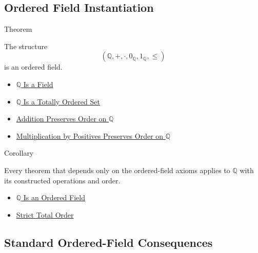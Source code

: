 \subsection*{Ordered Field Instantiation}

\begin{theorembox}{Theorem}
\begin{theorem}
\label{thm:q-is-an-ordered-field}
The structure
\[
(\mathbb{Q},+,\cdot,0_{\mathbb{Q}},1_{\mathbb{Q}},\le)
\]
is an ordered field.
\end{theorem}
\end{theorembox}

\begin{dependencies}
\begin{itemize}
  \item \hyperref[thm:q-is-a-field]{$\mathbb{Q}$ Is a Field}
  \item \hyperref[thm:q-totally-ordered-set]{$\mathbb{Q}$ Is a Totally Ordered Set}
  \item \hyperref[thm:addition-preserves-order-on-q]{Addition Preserves Order on $\mathbb{Q}$}
  \item \hyperref[thm:positive-multiplication-preserves-order-on-q]{Multiplication by Positives Preserves Order on $\mathbb{Q}$}
\end{itemize}
\end{dependencies}

\begin{corollarybox}{Corollary}
\begin{corollary}
\label{cor:ordered-field-laws-on-q}
Every theorem that depends only on the ordered-field axioms applies to
$\mathbb{Q}$ with its constructed operations and order.
\end{corollary}
\end{corollarybox}

\begin{dependencies}
\begin{itemize}
  \item \hyperref[thm:q-is-an-ordered-field]{$\mathbb{Q}$ Is an Ordered Field}
  \item \hyperref[def:strict-total-order]{Strict Total Order}
\end{itemize}
\end{dependencies}

\subsection*{Standard Ordered-Field Consequences}

